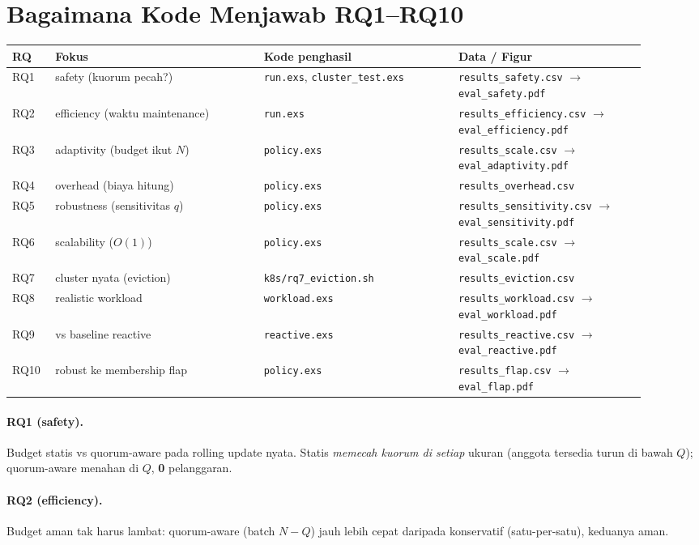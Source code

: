 \documentclass[11pt]{article}
\newcommand{\code}[1]{\texttt{\small #1}}
\begin{document}
\section{Bagaimana Kode Menjawab RQ1--RQ10}
\label{sec:rq}
\begin{longtable}{@{}p{0.06\linewidth} p{0.30\linewidth} p{0.28\linewidth} p{0.27\linewidth}@{}}
\toprule
\textbf{RQ} & \textbf{Fokus} & \textbf{Kode penghasil} & \textbf{Data / Figur} \\
\midrule \endhead
RQ1 & safety (kuorum pecah?) & \code{run.exs}, \code{cluster\_test.exs} & \code{results\_safety.csv} $\rightarrow$ \code{eval\_safety.pdf} \\
RQ2 & efficiency (waktu maintenance) & \code{run.exs} & \code{results\_efficiency.csv} $\rightarrow$ \code{eval\_efficiency.pdf} \\
RQ3 & adaptivity (budget ikut $N$) & \code{policy.exs} & \code{results\_scale.csv} $\rightarrow$ \code{eval\_adaptivity.pdf} \\
RQ4 & overhead (biaya hitung) & \code{policy.exs} & \code{results\_overhead.csv} \\
RQ5 & robustness (sensitivitas $q$) & \code{policy.exs} & \code{results\_sensitivity.csv} $\rightarrow$ \code{eval\_sensitivity.pdf} \\
RQ6 & scalability ($O(1)$) & \code{policy.exs} & \code{results\_scale.csv} $\rightarrow$ \code{eval\_scale.pdf} \\
RQ7 & cluster nyata (eviction) & \code{k8s/rq7\_eviction.sh} & \code{results\_eviction.csv} \\
RQ8 & realistic workload & \code{workload.exs} & \code{results\_workload.csv} $\rightarrow$ \code{eval\_workload.pdf} \\
RQ9 & vs baseline reactive & \code{reactive.exs} & \code{results\_reactive.csv} $\rightarrow$ \code{eval\_reactive.pdf} \\
RQ10 & robust ke membership flap & \code{policy.exs} & \code{results\_flap.csv} $\rightarrow$ \code{eval\_flap.pdf} \\
\bottomrule
\end{longtable}

\paragraph{RQ1 (safety).} Budget statis vs quorum-aware pada rolling update nyata. Statis
\emph{memecah kuorum di setiap} ukuran (anggota tersedia turun di bawah $Q$); quorum-aware menahan di
$Q$, \textbf{0} pelanggaran.
\paragraph{RQ2 (efficiency).} Budget aman tak harus lambat: quorum-aware (batch $N-Q$) jauh lebih cepat
daripada konservatif (satu-per-satu), keduanya aman.
\end{document}

